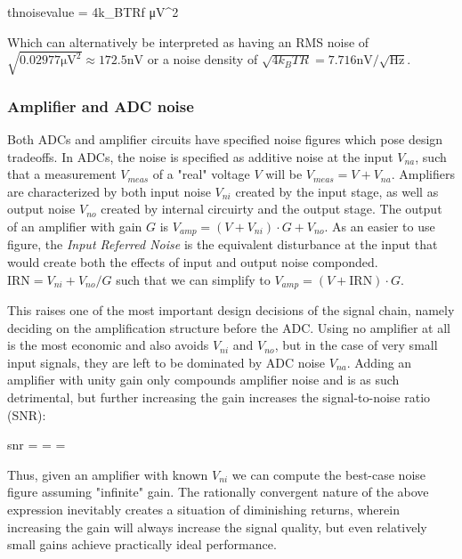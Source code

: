 \documentclass{thesis}
\newcommand{\uV}{\unit{\micro\volt}}
\newcommand{\nV}{\unit{\nano\volt}}
\newcommand{\Hz}{\unit{\hertz}}
\begin{document}
\begin{thesisequation}{thnoisevalue}
 = 4k_BTR\Delta f  \uV^2
\end{thesisequation}

Which can alternatively be interpreted as having an RMS noise of $\sqrt{0.02977 \uV^2} \approx 172.5 \nV$ or a noise density of $\sqrt{4k_BTR} = 7.716 \nV/\sqrt{\Hz}$. 

\subsubsection{Amplifier and ADC noise}

Both ADCs and amplifier circuits have specified noise figures which pose design tradeoffs. In ADCs, the noise is specified as additive noise at the input $V_{na}$, such that a measurement $V_{meas}$ of a "real" voltage $V$ will be $V_{meas} = V + V_{na}$. Amplifiers are characterized by both input noise $V_{ni}$ created by the input stage, as well as output noise $V_{no}$ created by internal circuirty and the output stage. The output of an amplifier with gain $G$ is $V_{amp} = (V + V_{ni}) \cdot G + V_{no}$. As an easier to use figure, the \textit{Input Referred Noise} is the equivalent disturbance at the input that would create both the effects of input and output noise componded. $\text{IRN} = V_{ni} + V_{no}/G$ such that we can simplify to $V_{amp} = (V + \text{IRN}) \cdot G$.

This raises one of the most important design decisions of the signal chain, namely deciding on the amplification structure before the ADC. Using no amplifier at all is the most economic and also avoids $V_{ni}$ and $V_{no}$, but in the case of very small input signals, they are left to be dominated by ADC noise $V_{na}$. Adding an amplifier with unity gain only compounds amplifier noise and is as such detrimental, but further increasing the gain increases the signal-to-noise ratio (SNR):

\begin{thesisequation}{snr}
 =  =  =  \longrightarrow {}
\end{thesisequation}

Thus, given an amplifier with known $V_{ni}$ we can compute the best-case noise figure assuming "infinite" gain. The rationally convergent nature of the above expression inevitably creates a situation of diminishing returns, wherein increasing the gain will always increase the signal quality, but even relatively small gains achieve practically ideal performance.
\end{document}
